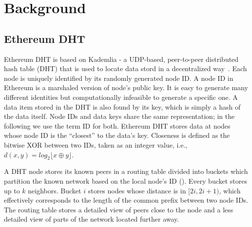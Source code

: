 
\section{Background}
\label{sec:background}


\subsection{Ethereum DHT}
Ethereum DHT is based on Kademlia - a UDP-based, peer-to-peer distributed hash table (DHT) that is used to locate data stord in a decentralized way~\cite{maymounkov2002kademlia}. Each node is uniquely identified by its randomly generated node ID. A node ID in Ethereum is a marshaled version of node's public key. It is easy to generate many different identities but computationally infeasible to generate a specific one. A data item stored in the DHT is also found by its key, which is simply a hash of the data itself. Node IDs and data keys share the same representation; in the following we use the term ID for both.
Ethereum DHT stores data at nodes whose node ID is the “closest” to the data’s key. Closeness is defined as the bitwise XOR between two IDs, taken as an integer value, i.e.,$d(x, y) = \textit{log}_2 \lfloor x \oplus y \rfloor$.


A DHT node stores its known peers in a routing table divided into buckets which partition the known network based on the local node’s ID (). Every bucket stores up to $k$ neighbors. Bucket $i$ stores nodes whose distance is in $[2i, 2i+1)$, which effectively corresponds to the length of the common prefix between two node IDs. The routing table stores a detailed view of peers close to the node and a less detailed view of parts of the network located further away.

